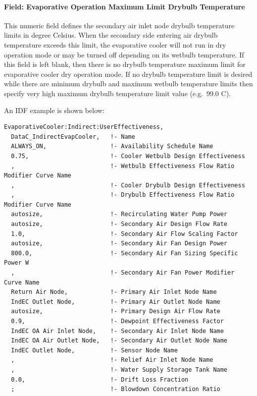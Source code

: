 \paragraph{Field: Evaporative Operation Maximum Limit Drybulb Temperature}\label{field-evaporative-operation-maximum-limit-drybulb-temperature-1}

This numeric field defines the secondary air inlet node drybulb temperature limits in degree Celsius. When the secondary side entering air drybulb temperature exceeds this limit, the evaporative cooler will not run in dry operation mode or may be turned off depending on its wetbulb temperature. If this field is left blank, then there is no drybulb temperature maximum limit for evaporative cooler dry operation mode. If no drybulb temperature limit is desired while there are minimum drybulb and maximum wetbulb temperature limits then specify very high maximum drybulb temperature limit value (e.g.~99.0 C).

An IDF example is shown below:

\begin{lstlisting}
EvaporativeCooler:Indirect:UserEffectiveness,
  DataC_IndirectEvapCooler,   !- Name
  ALWAYS_ON,                  !- Availability Schedule Name
  0.75,                       !- Cooler Wetbulb Design Effectiveness
  ,                           !- Wetbulb Effectiveness Flow Ratio Modifier Curve Name
  ,                           !- Cooler Drybulb Design Effectiveness
  ,                           !- Drybulb Effectiveness Flow Ratio Modifier Curve Name
  autosize,                   !- Recirculating Water Pump Power
  autosize,                   !- Secondary Air Design Flow Rate
  1.0,                        !- Secondary Air Flow Scaling Factor
  autosize,                   !- Secondary Air Fan Design Power
  800.0,                      !- Secondary Air Fan Sizing Specific Power W
  ,                           !- Secondary Air Fan Power Modifier Curve Name
  Return Air Node,            !- Primary Air Inlet Node Name
  IndEC Outlet Node,          !- Primary Air Outlet Node Name
  autosize,                   !- Primary Design Air Flow Rate
  0.9,                        !- Dewpoint Effectiveness Factor
  IndEC OA Air Inlet Node,    !- Secondary Air Inlet Node Name
  IndEC OA Air Outlet Node,   !- Secondary Air Outlet Node Name
  IndEC Outlet Node,          !- Sensor Node Name
  ,                           !- Relief Air Inlet Node Name
  ,                           !- Water Supply Storage Tank Name
  0.0,                        !- Drift Loss Fraction
  ;                           !- Blowdown Concentration Ratio
\end{lstlisting}


